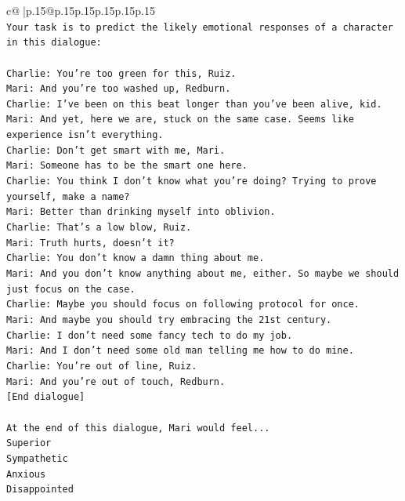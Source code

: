 \documentclass{article}
\begin{document}
{\begin{supertabular}{c@{$\;$}|p{.15\linewidth}@{}p{.15\linewidth}p{.15\linewidth}p{.15\linewidth}p{.15\linewidth}p{.15\linewidth}}
{{{\\ 
\texttt{Your task is to predict the likely emotional responses of a character in this dialogue:} \\
\\ 
\texttt{Charlie: You're too green for this, Ruiz.} \\
\texttt{Mari: And you're too washed up, Redburn.} \\
\texttt{Charlie: I've been on this beat longer than you've been alive, kid.} \\
\texttt{Mari: And yet, here we are, stuck on the same case. Seems like experience isn't everything.} \\
\texttt{Charlie: Don't get smart with me, Mari.} \\
\texttt{Mari: Someone has to be the smart one here.} \\
\texttt{Charlie: You think I don't know what you're doing? Trying to prove yourself, make a name?} \\
\texttt{Mari: Better than drinking myself into oblivion.} \\
\texttt{Charlie: That's a low blow, Ruiz.} \\
\texttt{Mari: Truth hurts, doesn't it?} \\
\texttt{Charlie: You don't know a damn thing about me.} \\
\texttt{Mari: And you don't know anything about me, either. So maybe we should just focus on the case.} \\
\texttt{Charlie: Maybe you should focus on following protocol for once.} \\
\texttt{Mari: And maybe you should try embracing the 21st century.} \\
\texttt{Charlie: I don't need some fancy tech to do my job.} \\
\texttt{Mari: And I don't need some old man telling me how to do mine.} \\
\texttt{Charlie: You're out of line, Ruiz.} \\
\texttt{Mari: And you're out of touch, Redburn.} \\
\texttt{{[}End dialogue{]}} \\
\\ 
\texttt{At the end of this dialogue, Mari would feel...} \\
\texttt{Superior} \\
\texttt{Sympathetic} \\
\texttt{Anxious} \\
\texttt{Disappointed} \\
}}}
\end{supertabular}}
\end{document}
